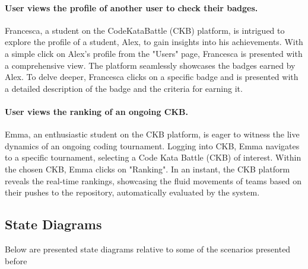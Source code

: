 \paragraph*{User views the profile of another user to check their badges.}
Francesca, a student on the CodeKataBattle (CKB) platform, is intrigued to explore the profile of a student, Alex, to gain insights into his achievements. 
With a simple click on Alex's profile from the "Users" page, Francesca is presented with a comprehensive view. 
The platform seamlessly showcases the badges earned by Alex. 
To delve deeper, Francesca clicks on a specific badge and is presented with a detailed description of the badge and the criteria for earning it.

\paragraph*{User views the ranking of an ongoing CKB.}
Emma, an enthusiastic student on the CKB platform, is eager to witness the live dynamics of an ongoing coding tournament.
Logging into CKB, Emma navigates to a specific tournament, selecting a Code Kata Battle (CKB) of interest.
Within the chosen CKB, Emma clicks on "Ranking". In an instant, the CKB platform reveals the real-time rankings, showcasing the fluid movements of teams based on their pushes to the repository, automatically evaluated by the system.


\subsection{State Diagrams}
\label{subsec:state_diagrams}%

Below are presented state diagrams relative to some of the scenarios presented before

